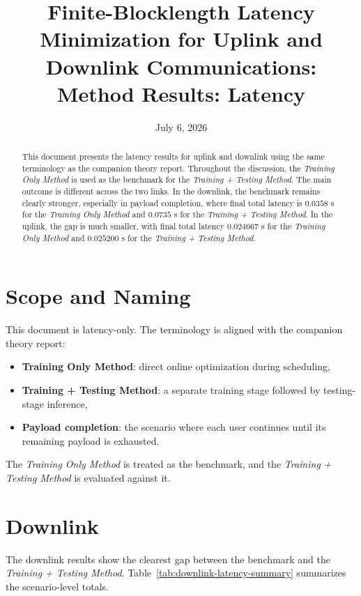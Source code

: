 \documentclass[11pt]{article}
\title{Finite-Blocklength Latency Minimization for Uplink and Downlink Communications:\\Method Results: Latency}
\author{}
\date{July 6, 2026}
\begin{document}
\maketitle

\begin{abstract}
This document presents the latency results for uplink and downlink using the
same terminology as the companion theory report. Throughout the discussion, the
\emph{Training Only Method} is used as the benchmark for the
\emph{Training + Testing Method}. The main outcome is different across the two
links. In the downlink, the benchmark remains clearly stronger, especially in
payload completion, where final total latency is \(0.0358\) s for the
\emph{Training Only Method} and \(0.0735\) s for the \emph{Training + Testing
Method}. In the uplink, the gap is much smaller, with final total latency
\(0.024667\) s for the \emph{Training Only Method} and \(0.025200\) s for the
\emph{Training + Testing Method}.
\end{abstract}

\section{Scope and Naming}

This document is latency-only. The terminology is aligned with
the companion theory report:
\begin{itemize}[leftmargin=1.5em]
    \item \textbf{Training Only Method}: direct online optimization during scheduling,
    \item \textbf{Training + Testing Method}: a separate training stage followed by testing-stage inference,
    \item \textbf{Payload completion}: the scenario where each user continues until its remaining payload is exhausted.
\end{itemize}

The \emph{Training Only Method} is treated as the benchmark, and the
\emph{Training + Testing Method} is evaluated against it.

\section{Downlink}

The downlink results show the clearest gap between the benchmark and the
\emph{Training + Testing Method}. Table~\ref{tab:downlink-latency-summary}
summarizes the scenario-level totals.
\end{document}

